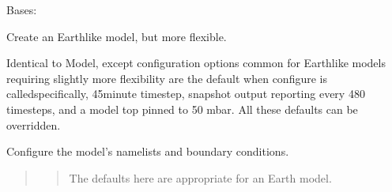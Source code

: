 \documentclass[letterpaper,10pt,english]{sphinxmanual}
\begin{document}
\begin{fulllineitems}
\label{\detokenize{source/exoplasim:exoplasim.Earthlike}}
Bases: {\hyperref[\detokenize{source/exoplasim:exoplasim.Model}]{}}

Create an Earth\sphinxhyphen{}like model, but more flexible.

Identical to Model, except configuration options common for
Earth\sphinxhyphen{}like models requiring slightly more flexibility are
the default when configure is called\textendash{}specifically, 45\sphinxhyphen{}minute
timestep, snapshot output reporting every 480 timesteps, and
a model top pinned to 50 mbar. All these defaults can be overridden.

\begin{fulllineitems}
\label{\detokenize{source/exoplasim:exoplasim.Earthlike.configure}}
Configure the model’s namelists and boundary conditions.
\begin{quote}
\begin{quote}

The defaults here are appropriate for an Earth model.
\end{quote}


\end{quote}
\end{fulllineitems}
\end{fulllineitems}
\end{document}

